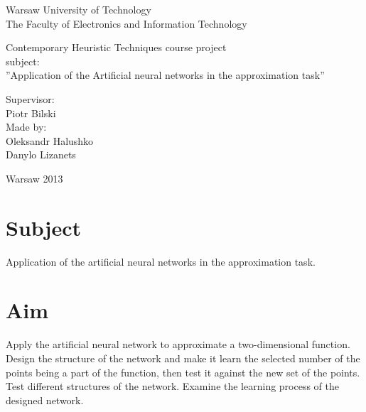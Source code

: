 \documentclass[a4paper,12pt]{article}
\begin{document}
\large
\begin{titlepage}
 \begin{center}
Warsaw University of Technology\\
The Faculty of Electronics and Information Technology
  
  \vspace{35ex}
  
Contemporary Heuristic Techniques  course project\\
subject:\\
''Application of the Artificial neural networks in the approximation task''

  
  \vspace{35ex}
  
 \end{center}
 \begin{flushright}
Supervisor:\\
Piotr Bilski\\
Made by:\\
Oleksandr Halushko\\
Danylo Lizanets

\vspace{15ex}

 \end{flushright}
  
  \begin{center}
   Warsaw 2013
  \end{center}

\end{titlepage}

\tableofcontents
\newpage
\section{Subject}

Application of the artificial neural networks in the approximation task.

\section{Aim}

Apply the artificial neural network to approximate a two-dimensional function. Design the structure of the network and make it learn the selected number of the points being a part of the function, then test it against the new set of the points. Test different structures of the network. Examine the learning process of the designed network.
\end{document}
